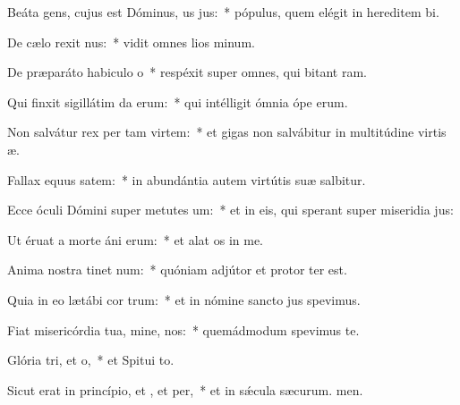 \item Beáta gens, cujus est Dóminus, us jus:~* pópulus, quem elégit in hereditem bi.
\item De cælo rexit nus:~* vidit omnes lios minum.
\item De præparáto habiculo o~* respéxit super omnes, qui bitant ram.
\item Qui finxit sigillátim da erum:~* qui intélligit ómnia ópe erum.
\item Non salvátur rex per tam virtem:~* et gigas non salvábitur in multitúdine virtis æ.
\item Fallax equus  satem:~* in abundántia autem virtútis suæ  salbitur.
\item Ecce óculi Dómini super metutes um:~* et in eis, qui sperant super miseridia jus:
\item Ut éruat a morte áni erum:~* et alat os in me.
\item Anima nostra tinet num:~* quóniam adjútor et protor ter est.
\item Quia in eo lætábi cor trum:~* et in nómine sancto jus spevimus.
\item Fiat misericórdia tua, mine,  nos:~* quemádmodum spevimus  te.
\item Glória tri, et o,~* et Spitui to.
\item Sicut erat in princípio, et , et per,~* et in sǽcula sæcurum. men.
